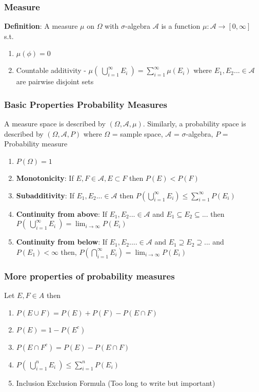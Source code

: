 \documentclass[12pt]{article}
\begin{document}
\subsubsection*{Measure}
\textbf{Definition}: A measure $\mu$ on $\Omega$ with $\sigma$-algebra $\mathcal{A}$ is a function $\mu : \mathcal{A} \xrightarrow{} [0,\infty]$ s.t.
\begin{enumerate}
    \item $\mu(\phi) = 0$
    \item Countable additivity - $\mu(\: \bigcup\limits_{i=1}^{\infty}E_{i} \:) = \sum\limits_{i=1}^{\infty} \mu(E_{i})$ where $E_1, E_2... \in \mathcal{A}$ are pairwise disjoint sets 
\end{enumerate}

\subsubsection*{Basic Properties Probability Measures}
A measure space is described by $(\Omega, \mathcal{A}, \mu)$. Similarly, a probability space is described by $(\Omega, \mathcal{A}, P)$ where $\Omega$ = sample space, $\mathcal{A}$ = $\sigma$-algebra, $P$ = Probability measure
\begin{enumerate}
    \item $P(\Omega) = 1$
    \item \textbf{Monotonicity}: If $E,F \in \mathcal{A}, E \subset F$ then $P(E) < P(F)$
    \item \textbf{Subadditivity}: If $E_{1}, E_{2}... \in \mathcal{A}$ then $P(\bigcup\limits_{i=1}^{\infty}E_i) \leq \sum\limits_{i=1}^{\infty} P(E_i)$
    \item \textbf{Continuity from above}: If $E_{1}, E_{2}... \in \mathcal{A}$ and $E_1 \subseteq E_2 \subseteq$... then $P(\: \bigcup\limits_{i=1}^{\infty}E_{i} \:) = \lim_{i\to\infty} P(E_i)$
    \item \textbf{Continuity from below}: If $E_1, E_2 .... \in \mathcal{A}$ and $E_1 \supseteq E_2 \supseteq$... \: and $P(E_1) < \infty$ then, \: $P(\bigcap\limits_{i=1}^{\infty}E_i) = \lim_{i \to\infty}P(E_i)$
\end{enumerate}

\subsubsection*{More properties of probability measures}
Let $E,F \in A$ then 
\begin{enumerate}
    \item $P(E \cup F) = P(E) + P(F) - P(E \cap F)$
    \item $P(E) = 1 - P(E^{c})$
    \item $P(E \cap F^{c}) = P(E) - P(E \cap F)$
    \item $P(\: \bigcup\limits_{i=1}^{n}E_{i} \:) \leq \sum\limits_{i=1}^{n}P(E_i)$ 
    \item Inclusion Exclusion Formula (Too long to write but important)  
\end{enumerate}
\end{document}
